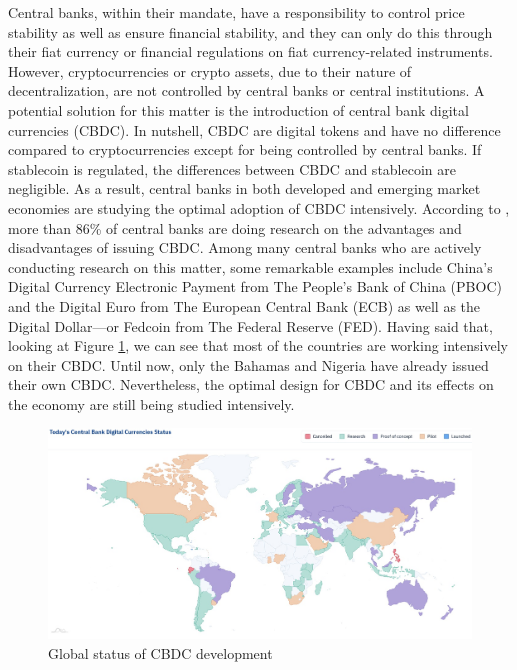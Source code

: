 \documentclass[12pt, a4paper]{article}
\begin{document}
Central banks, within their mandate, have a responsibility to control price stability as well as ensure financial stability, and they can only do this through their fiat currency or financial regulations on fiat currency-related instruments. However, cryptocurrencies or crypto assets, due to their nature of decentralization, are not controlled by central banks or central institutions. A potential solution for this matter is the introduction of central bank digital currencies (CBDC). In nutshell, CBDC are digital tokens and have no difference compared to cryptocurrencies except for being controlled by central banks. If stablecoin is regulated, the differences between CBDC and stablecoin are negligible. As a result, central banks in both developed and emerging market economies are studying the optimal adoption of CBDC intensively. According to \cite{auer2021cbdcs}, more than 86\% of central banks are doing research on the advantages and disadvantages of issuing CBDC. Among many central banks who are actively conducting research on this matter, some remarkable examples include China’s Digital Currency Electronic Payment from The People's Bank of China (PBOC) and the Digital Euro from The European Central Bank (ECB) as well as the Digital Dollar—or Fedcoin from The Federal Reserve (FED). Having said that, looking at Figure \ref{cbdcmap}, we can see that most of the countries are working intensively on their CBDC. Until now, only the Bahamas and Nigeria have already issued their own CBDC. Nevertheless, the optimal design for CBDC and its effects on the economy are still being studied intensively.

\begin{figure}[H]
  \hspace{-0.7cm}
  \caption{Global status of CBDC development}
	\centering
	\centerline{\includegraphics[scale=0.3 ]{cbdc.jpg}}
	\label{cbdcmap}
\end{figure}
\end{document}
